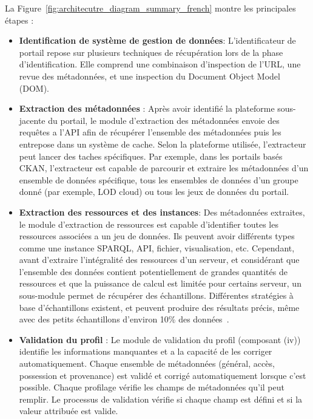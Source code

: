 La Figure~\ref{fig:architecutre_diagram_summary_french} montre les principales \'{e}tapes :

\begin{itemize}
	\item \textbf{Identification de syst\`{e}me de gestion de donn\'{e}es}: L'identificateur de portail repose sur plusieurs techniques de r\'{e}cup\'{e}ration lors de la phase d'identification. Elle comprend une combinaison d'inspection de l'URL, une revue des m\'{e}tadonn\'{e}es, et une inspection du Document Object Model (DOM).
	\item \textbf{Extraction des m\'{e}tadonn\'{e}es} : Apr\`{e}s avoir identifi\'{e} la plateforme sous-jacente du portail, le module d'extraction des m\'{e}tadonn\'{e}es envoie des requêtes a l'API afin de r\'{e}cup\'{e}rer l’ensemble des m\'{e}tadonn\'{e}es puis les entrepose dans un syst\`{e}me de cache. Selon la plateforme utilis\'{e}e, l'extracteur peut lancer des taches sp\'{e}cifiques. Par exemple, dans les portails bas\'{e}s CKAN, l'extracteur est capable de parcourir et extraire les m\'{e}tadonn\'{e}es d'un ensemble de donn\'{e}es sp\'{e}cifique, tous les ensembles de donn\'{e}es d'un groupe donn\'{e} (par exemple, LOD cloud) ou tous les jeux de donn\'{e}es du portail.
	\item \textbf{Extraction des ressources et des instances}: Des m\'{e}tadonn\'{e}es extraites, le module d'extraction de ressources est capable d'identifier toutes les ressources associ\'{e}es a un jeu de donn\'{e}es. Ils peuvent avoir diff\'{e}rents types comme une instance SPARQL, API, fichier, visualisation, etc. Cependant, avant d'extraire l'int\'{e}gralit\'{e} des ressources d'un serveur, et consid\'{e}rant que l'ensemble des donn\'{e}es contient potentiellement de grandes quantit\'{e}s de ressources et que la puissance de calcul est limit\'{e}e pour certains serveur, un sous-module permet de r\'{e}cup\'{e}rer des \'{e}chantillons. Diff\'{e}rentes strat\'{e}gies à base d'\'{e}chantillons existent, et peuvent produire des r\'{e}sultats pr\'{e}cis, même avec des petits \'{e}chantillons d'environ 10\% des donn\'{e}es~\cite{Fetahu:ESWC:14}.
	\item \textbf{Validation du profil} : Le module de validation du profil (composant (iv)) identifie les informations manquantes et a la capacit\'{e} de les corriger automatiquement. Chaque ensemble de m\'{e}tadonn\'{e}es (g\'{e}n\'{e}ral, acc\`{e}s, possession et provenance) est valid\'{e} et corrig\'{e} automatiquement lorsque c'est possible. Chaque profilage v\'{e}rifie les champs de m\'{e}tadonn\'{e}es qu'il peut remplir. Le processus de validation v\'{e}rifie si chaque champ est d\'{e}fini et si la valeur attribu\'{e}e est valide.


\end{itemize}
